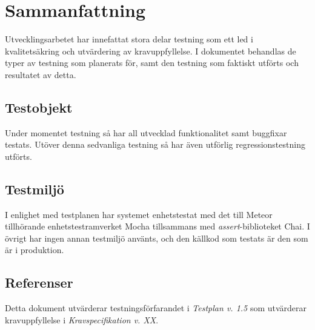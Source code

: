 \section{Sammanfattning}
Utvecklingsarbetet har innefattat stora delar testning som ett led i kvalitetsäkring och utvärdering av kravuppfyllelse. I dokumentet behandlas de typer av testning som planerats för, samt den testning som faktiskt utförts och resultatet av detta.
\subsection{Testobjekt}
Under momentet testning så har all utvecklad funktionalitet samt buggfixar testats. Utöver denna sedvanliga testning så har även utförlig regressionstestning utförts.
\subsection{Testmiljö}
I enlighet med testplanen har systemet enhetstestat med det till Meteor tillhörande enhetstestramverket Mocha tillsammans med \textit{assert}-biblioteket Chai. I övrigt har ingen annan testmiljö använts, och den källkod som testats är den som är i produktion.
\subsection{Referenser}
Detta dokument utvärderar testningsförfarandet i \textit{Testplan v. 1.5} som utvärderar kravuppfyllelse i \textit{Kravspecifikation v. XX}. 

